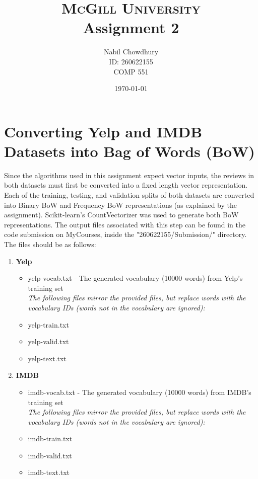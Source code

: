 \documentclass{article}
\title{
	\normalfont\normalsize
    \textsc{McGill University}
    \horrule{0.5pt} \\[0.3cm]
	\huge Assignment 2
    \horrule{2pt} \\[0.3cm]
}
\author{
	Nabil Chowdhury \\
	\small{ID: 260622155} \\
    \small{COMP 551}
}
\date{\normalsize\today}
\begin{document}
\maketitle

\section{Converting Yelp and IMDB Datasets into Bag of Words (BoW)}
Since the algorithms used in this assignment expect vector inputs, the reviews in both datasets must first be converted into a fixed length vector representation. Each of the training, testing, and validation splits of both datasets are converted into Binary BoW and Frequency BoW representations (as explained by the assignment). Scikit-learn's CountVectorizer was used to generate both BoW representations. The output files associated with this step can be found in the code submission on MyCourses, inside the "260622155/Submission/" directory. The files should be as follows:

\begin{enumerate}
	\item \textbf{Yelp}
		\begin{itemize}
			\item yelp-vocab.txt - The generated vocabulary (10000 words) from Yelp's training set \\ 
			\newline
			\textit{The following files mirror the provided files, but replace words with the vocabulary IDs (words not in the vocabulary are ignored):}
			\item yelp-train.txt
            \item yelp-valid.txt
            \item yelp-text.txt
		\end{itemize}
	\item \textbf{IMDB}
		\begin{itemize}
			\item imdb-vocab.txt - The generated vocabulary (10000 words) from IMDB's training set \\ 
			\newline
			\textit{The following files mirror the provided files, but replace words with the vocabulary IDs (words not in the vocabulary are ignored):}
			\item imdb-train.txt
            \item imdb-valid.txt
            \item imdb-text.txt
		\end{itemize}
\end{enumerate}
\end{document}
